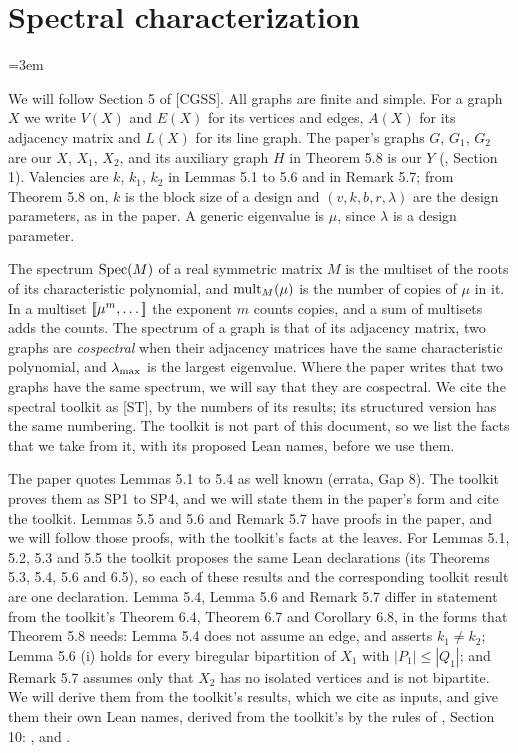 \section{Spectral characterization}\label{sec:5}
\begingroup
\emergencystretch=3em
\raggedbottom

We will follow Section 5 of [CGSS]. All graphs are finite and simple. For a graph $X$ we write
$V(X)$ and $E(X)$ for its vertices and edges, $A(X)$ for its adjacency matrix and $L(X)$ for
its line graph. The paper's graphs $G$, $G_1$, $G_2$ are our $X$, $X_1$, $X_2$, and its
auxiliary graph $H$ in Theorem 5.8 is our $Y$ (, Section 1). Valencies
are $k$, $k_1$, $k_2$ in Lemmas 5.1 to 5.6 and in Remark 5.7; from Theorem 5.8 on, $k$ is the
block size of a design and $(v,k,b,r,\lambda)$ are the design parameters, as in the paper. A
generic eigenvalue is $\mu$, since $\lambda$ is a design parameter.

The spectrum $\mathop{\mathrm{Spec}}\nolimits(M)$ of a real symmetric matrix $M$ is the multiset of the roots of its
characteristic polynomial, and $\mathop{\mathrm{mult}}\nolimits_M(\mu)$ is the number of copies of $\mu$ in it. In a
multiset $\left[\!\left[\mu^{m},\dots\right]\!\right]$ the exponent $m$ counts copies, and a sum of multisets adds the
counts. The spectrum of a graph is that of its adjacency matrix, two graphs are
\emph{cospectral} when their adjacency matrices have the same characteristic polynomial, and
$\lambda_{\max}$ is the largest eigenvalue. Where the paper writes that two graphs have the same
spectrum, we will say that they are cospectral. We cite the spectral toolkit  as [ST],
by the numbers of its results; its structured version 
has the same numbering. The toolkit is not part of this document, so we list the facts that we
take from it, with its proposed Lean names, before we use them.

The paper quotes Lemmas 5.1 to 5.4 as well known (errata, Gap 8). The toolkit proves them as
SP1 to SP4, and we will state them in the paper's form and cite the toolkit. Lemmas 5.5 and 5.6
and Remark 5.7 have proofs in the paper, and we will follow those proofs, with the toolkit's
facts at the leaves. For Lemmas 5.1, 5.2, 5.3 and 5.5 the toolkit proposes the same Lean
declarations (its Theorems 5.3, 5.4, 5.6 and 6.5), so each of these results and the
corresponding toolkit result are one declaration. Lemma 5.4, Lemma 5.6 and Remark 5.7 differ in
statement from the toolkit's Theorem 6.4, Theorem 6.7 and Corollary 6.8, in the forms that
Theorem 5.8 needs: Lemma 5.4 does not assume an edge, and asserts $k_1\ne k_2$; Lemma 5.6 (i) holds for
every biregular bipartition of $X_1$ with $|P_1|\le|Q_1|$; and Remark 5.7 assumes only that
$X_2$ has no isolated vertices and is not bipartite. We will derive them from the toolkit's
results, which we cite as inputs, and give them their own Lean names, derived from the
toolkit's by the rules of , Section 10:
,
 and
.

